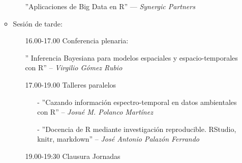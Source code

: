 \begin{itemize}
\begin{itemize}
\begin{itemize}
    ''Aplicaciones de Big Data en R'' --- \emph{Synergic Partners} 
    \end{itemize}

  \item Sesión de tarde:
    \begin{itemize}
    \item[]16.00-17.00 Conferencia plenaria:
    
    '' Inferencia Bayesiana para modelos espaciales y espacio-temporales 
    con R'' -- \emph{Virgilio Gómez Rubio}
    \item[] 17.00-19.00 Talleres paralelos
    \begin{enumerate}
    \item[-] ''Cazando información espectro-temporal en datos 
             ambientales con R'' -- \emph{Josué M. Polanco Martínez}
    \item[-] ''Docencia de R mediante investigación reproducible. 
              RStudio, knitr, markdown'' -- \emph{José Antonio Palazón Ferrando}
    \end{enumerate}
    \item[]19.00-19:30 Clausura Jornadas
    \end{itemize}
  \end{itemize}
\end{itemize}


